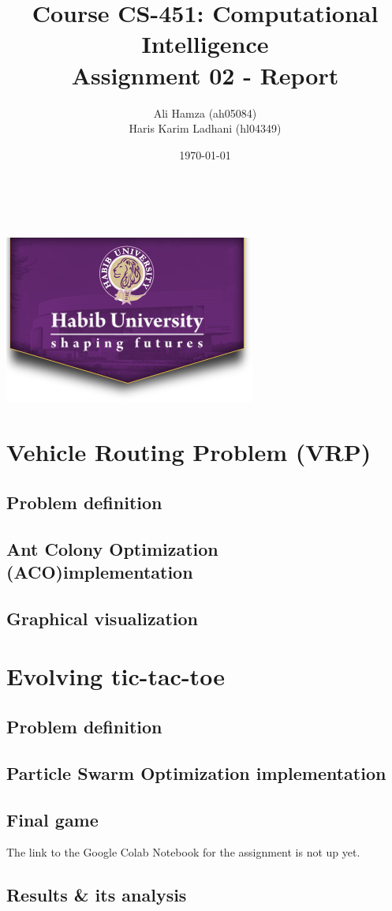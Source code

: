 \documentclass[11pt, letterpaper]{article}
\begin{document}
\title{\large Course CS-451: Computational Intelligence\\[0.5cm]
        \bf\Large Assignment 02 - Report}
\author{\large Ali Hamza (ah05084) \\ Haris Karim Ladhani (hl04349)}
\date{\today}
\makeatletter
    \begin{titlepage}
        \begin{center}
        \vbox{}\vspace{5cm}
            {\@title }\\[3cm] 
            {\@author}\\
            \vfill \includegraphics[scale=0.5]{images/logo.png}\\[1cm]
            {\@date}
        \end{center}
    \end{titlepage}
\makeatother

\newpage

\tableofcontents

\newpage

\section{Vehicle Routing Problem (VRP)}
\subsection{Problem definition}
\subsection{Ant Colony Optimization (ACO)implementation}
\subsection{Graphical visualization}

\section{Evolving tic-tac-toe}
\subsection{Problem definition}
\subsection{Particle Swarm Optimization implementation}
\subsection {Final game}
The link to the Google Colab Notebook for the assignment is not up yet.
\subsection {Results \& its analysis}
\end{document}
